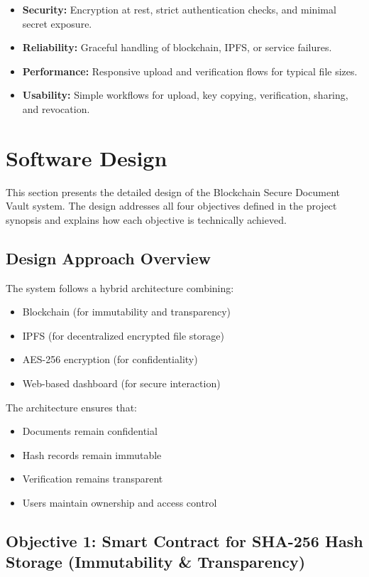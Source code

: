 \documentclass[12pt]{article}
\begin{document}
\begin{itemize}
\item \textbf{Security:} Encryption at rest, strict authentication checks, and minimal secret exposure.
\item \textbf{Reliability:} Graceful handling of blockchain, IPFS, or service failures.
\item \textbf{Performance:} Responsive upload and verification flows for typical file sizes.
\item \textbf{Usability:} Simple workflows for upload, key copying, verification, sharing, and revocation.
\end{itemize}

\newpage
\section{Software Design}

This section presents the detailed design of the Blockchain Secure Document Vault system. The design addresses all four objectives defined in the project synopsis and explains how each objective is technically achieved.

\subsection{Design Approach Overview}

The system follows a hybrid architecture combining:

\begin{itemize}
\item Blockchain (for immutability and transparency)
\item IPFS (for decentralized encrypted file storage)
\item AES-256 encryption (for confidentiality)
\item Web-based dashboard (for secure interaction)
\end{itemize}

The architecture ensures that:

\begin{itemize}
\item Documents remain confidential
\item Hash records remain immutable
\item Verification remains transparent
\item Users maintain ownership and access control
\end{itemize}

\subsection{Objective 1: Smart Contract for SHA-256 Hash Storage (Immutability \& Transparency)}
\end{document}
